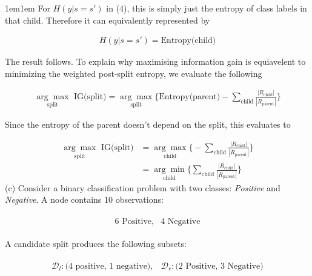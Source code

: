 \documentclass[11pt]{article}
\begin{document}
\begin{adjustwidth}{1em}{1em}
        For $H(y | s = s')$ in (4), this is simply just the entropy of class labels in that child.
        Therefore it can equivalently represented by 

        \begin{align*}
        H(y | s = s') = \text{Entropy(child)}
        \end{align*}

        The result follows. To explain why maximising information gain is equiavelent to minimizing
        the weighted post-split entropy, we evaluate the following

        \begin{align*}
            \underset{\text{split}}{\arg\max} \text{ IG(split)} = \underset{\text{split}}{\arg\max}
            \bigg\{\text{Entropy(parent)} - \sum_{\text{child}}
            \frac{|R_{\text{child}}|}{|R_\text{parent}|}\bigg\}
        \end{align*}

        Since the entropy of the parent doesn't depend on the split, this evaluates to 

        \begin{align*}
            \underset{\text{split}}{\arg\max} \text{ IG(split)} 
                &= \underset{\text{child}}{\arg\max}\bigg\{-\sum_{\text{child}}
                \frac{|R_\text{child}|}{|R_\text{parent}|}\bigg\} \\ 
                &= \underset{\text{child}}{\arg\min}\bigg\{\sum_{\text{child}}
                \frac{|R_\text{child}|}{|R_\text{parent}|}\bigg\}
        \end{align*}
        (c) Consider a binary classification problem with two classes: \textit{Positive} and
        \textit{Negative}. A node contains 10 observations:

        \begin{align*}
            \begin{matrix}
                \text{6 Positive}, & \text{4 Negative}
            \end{matrix}
        \end{align*}

        A candidate split produces the following subsets:

        \begin{align*}
            \begin{matrix}
                \mathcal{D}_l: \text{(4 positive, 1 negative)}, & \mathcal{D}_r: \text{(2 Positive, 3
                Negative)}
            \end{matrix}
        \end{align*}


\end{adjustwidth}
\end{document}
